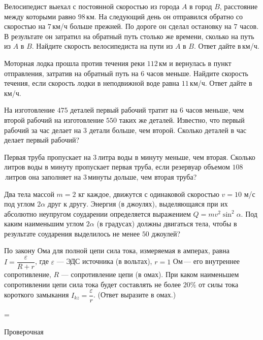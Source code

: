 \begin{class}[number=7]
\begin{listofex}
		\item Велосипедист выехал с постоянной скоростью из города \(A\) в город \(B\), расстояние между которыми равно \(98\) км. На следующий день он отправился обратно со скоростью на \(7\) км/ч больше прежней. По дороге он сделал остановку на \(7\) часов. В результате он затратил на обратный путь столько же времени, сколько на путь из \(A\) в \(B\). Найдите скорость велосипедиста на пути из \(A\) в \(B\). Ответ дайте в км/ч.
		\item Моторная лодка прошла против течения реки \(112\) км и вернулась в пункт отправления, затратив на обратный путь на \(6\) часов меньше. Найдите скорость течения, если скорость лодки в неподвижной воде равна \(11\) км/ч. Ответ дайте в км/ч.
		\item На изготовление \(475\) деталей первый рабочий тратит на \(6\) часов меньше, чем второй рабочий на изготовление \(550\) таких же деталей. Известно, что первый рабочий за час делает на \(3\) детали больше, чем второй. Сколько деталей в час делает первый рабочий?
		\item Первая труба пропускает на \(3\) литра воды в минуту меньше, чем вторая. Сколько литров воды в минуту пропускает первая труба, если резервуар объемом \(108\) литров она заполняет на \(3\) минуты дольше, чем вторая труба?
		\item Два тела массой \(m=2\) кг каждое, движутся с одинаковой скоростью  \(v =10\) м/с под углом \(2\alpha\) друг к другу. Энергия (в джоулях), выделяющаяся при их абсолютно неупругом соударении определяется выражением \(Q = m v^2\sin^2 \alpha \). Под каким наименьшим углом \(2\alpha\) (в градусах) должны двигаться тела, чтобы в результате соударения выделилось не менее \(50\) джоулей?
		\item По закону Ома для полной цепи сила тока, измеряемая в амперах, равна \( I=\dfrac{ \varepsilon }{ R+r } \), где \(\varepsilon\) --- ЭДС источника (в вольтах), \(r=1\) Ом --- его внутреннее сопротивление, \(R\) --- сопротивление цепи (в омах). При каком наименьшем сопротивлении цепи сила тока будет составлять не более \(20\%\) от силы тока короткого замыкания \(I_{kz}=\dfrac{ \varepsilon }{ r }\). (Ответ выразите в омах.)
	\end{listofex}
\end{class}

=%
\begin{exam}
	\begin{listofex}
		\item Проверочная
	\end{listofex}
\end{exam}

